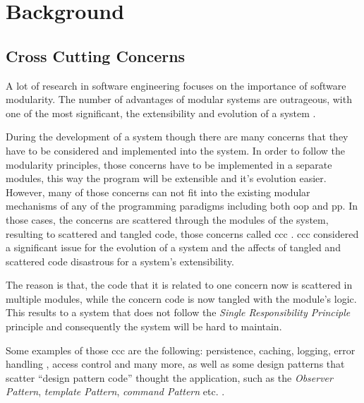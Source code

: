 \chapter{Background}\label{Background}

\section{Cross Cutting Concerns}\label{Cross Cutting Concerns}
A lot of research in software engineering focuses on the importance of software modularity. 
The number of advantages of modular systems are outrageous, with one of the most significant, the extensibility and evolution of a system \cite{parnas1972criteria}.

During the development of a system though there are many concerns that they have to be considered and implemented into the system. 
In order to follow the modularity principles, those concerns have to be implemented in a separate modules, this way the program will be extensible and it's evolution easier.
However, many of those concerns can not fit into the existing modular mechanisms of any of the programming paradigms including both \ac{oop} and \ac{pp}. 
In those cases, the concerns are scattered through the modules of the system, resulting to scattered and tangled code, those concerns called \acrlong{ccc} \cite{hannemann2005role}.
\ac{ccc} considered a significant issue for the evolution of a system and the affects of tangled and scattered code disastrous for a system's extensibility.

The reason is that, the code that it is related to one concern now is scattered in multiple modules, while the concern code is now tangled with the module's logic. 
This results to a system that does not follow the \textit{Single Responsibility Principle} principle and consequently the system will be hard to maintain.

Some examples of those \ac{ccc} are the following: persistence, caching, logging, error handling \cite{lippert2000study}, access control and many more, as well as some design patterns that scatter ``design pattern code'' thought the application, such as the \textit{Observer Pattern}, \textit{template Pattern}, \textit{command Pattern} etc. \cite{hannemann2002design} \cite{marin2004refactoring}.

